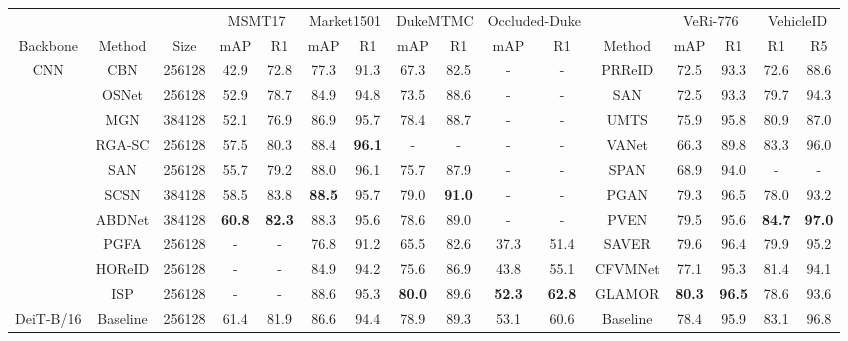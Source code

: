 \documentclass[10pt,twocolumn,letterpaper]{article}
\begin{document}
\renewcommand{\multirowsetup}{\centering}
\begin{table*}[ht]
\setlength\tabcolsep{4.5pt}
    \footnotesize
    \begin{center}
    \begin{tabular}{ccc|cccccccc||c|cccc}
    \hline
    \multicolumn{3}{c|}{} & \multicolumn{2}{c}{MSMT17} & \multicolumn{2}{c}{Market1501} & \multicolumn{2}{c}{DukeMTMC} & \multicolumn{2}{c||}{Occluded-Duke} & &\multicolumn{2}{c}{VeRi-776} &\multicolumn{2}{c}{VehicleID}\\
    Backbone & Method & Size    & mAP  & R1  & mAP & R1  & mAP  & R1  & mAP  & R1 & Method     &  mAP  & R1 & R1  & R5\\
    \hline
    \hline
    \multirow{7}{*}{CNN} &CBN \cite{camera-bn} 	& 256128    &42.9  & 72.8 & 77.3 & 91.3 & 67.3 & 82.5 & - &- & PRReID\cite{he2019part}  & 72.5&93.3 & 72.6& 88.6 \\
    &OSNet \cite{zhou2019omni} 		& 256128    &52.9  & 78.7 & 84.9 & 94.8 & 73.5 & 88.6 & - &- & SAN\cite{qian2020stripe}  & 72.5&93.3 & 79.7& 94.3 \\
    &MGN \cite{MGN}     & 384128    &52.1  & 76.9 & 86.9 & 95.7 & 78.4 & 88.7 & - &- & UMTS \cite{jin2020uncertainty}  & 75.9&95.8 & 80.9& 87.0 \\
    &RGA-SC \cite{RGA} & 256128    & 57.5 & 80.3 & 88.4 & \textbf{96.1} & - & - & - &- & VANet \cite{chu2019vehicle}  & 66.3& 89.8 & 83.3& 96.0 \\
    &SAN \cite{SAN}       & 256128  & 55.7 & 79.2 & 88.0 & 96.1 & 75.7 & 87.9 & - & - & SPAN \cite{SPAN} & 68.9 & 94.0 & - & -\\
    &SCSN \cite{SCSN}       & 384128  & 58.5 & 83.8 & \textbf{88.5} & 95.7 & 79.0 & \textbf{91.0} & - &- & PGAN \cite{PGAN}& 79.3 & 96.5 & 78.0 & 93.2\\
    &ABDNet \cite{ABD-Net}       & 384128  &\textbf{ 60.8} & \textbf{82.3} & 88.3 & 95.6 & 78.6 & 89.0 & - &- & PVEN \cite{PVEN} & 79.5&95.6 & \textbf{84.7}& \textbf{97.0} \\
&PGFA \cite{miao2019pose} & 256128  & - & - & 76.8 & 91.2 & 65.5 & 82.6  & 37.3 & 51.4 & SAVER \cite{khorramshahi2020devil} & 79.6 & 96.4 & 79.9& 95.2 \\
    &HOReID \cite{wang2020high} & 256128  & - & - & 84.9 & 94.2 & 75.6 & 86.9 & 43.8 & 55.1 & CFVMNet \cite{sun2020cfvmnet}  & 77.1&95.3 & 81.4& 94.1 \\
    &ISP \cite{ISP}       & 256128  & - & - & 88.6 & 95.3 & \textbf{80.0} & 89.6 & \textbf{52.3} &\textbf{62.8} & GLAMOR\cite{GLAMOR} & \textbf{80.3} & \textbf{96.5} & 78.6 & 93.6\\
    \hline
    \multirow{5}{*}{DeiT-B/16}     &Baseline & 256128 & 61.4 & 81.9 & 86.6  &94.4  &78.9 &89.3 &53.1 &60.6 
    &Baseline &78.4 &95.9 &83.1 &96.8\\
    

\end{tabular}
\end{center}
\end{table*}
\end{document}
